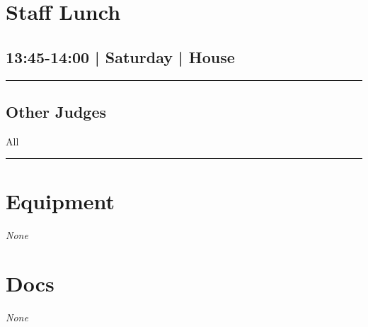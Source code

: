 \documentclass[10pt, A5]{article}
\begin{document}
        \begin{framed}
        \begin{minipage}{\textwidth}

        \setcounter{section}{11}
        \section{Staff Lunch}
        \subsection*{13:45-14:00 | Saturday | House}

        \vspace{0.25cm}
        \hrule
        \vspace{0.25cm}


        \subsection*{Other Judges}
                    All

            \vspace{0.25cm}
        \hrule
        \vspace{0.25cm}

        \begin{multicols}{2}

		\section*{\faWrench \: Equipment}

				\textit{None}
		
		\vfill\null
		\columnbreak

			\section*{\faFile \: Docs}
		 	\textit{None}
	

		\vfill\null

		\end{multicols}
\end{minipage}
\end{framed}
\end{document}
